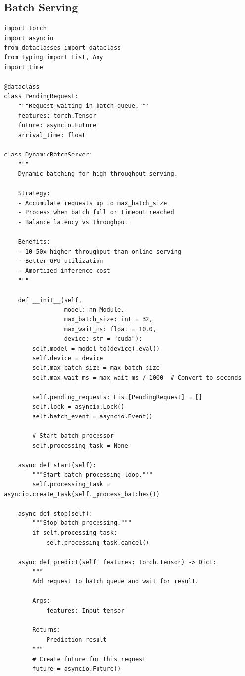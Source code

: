 \subsection{Batch Serving}

\begin{lstlisting}[style=python, caption=Dynamic batch serving for throughput optimization]
import torch
import asyncio
from dataclasses import dataclass
from typing import List, Any
import time

@dataclass
class PendingRequest:
    """Request waiting in batch queue."""
    features: torch.Tensor
    future: asyncio.Future
    arrival_time: float

class DynamicBatchServer:
    """
    Dynamic batching for high-throughput serving.

    Strategy:
    - Accumulate requests up to max_batch_size
    - Process when batch full or timeout reached
    - Balance latency vs throughput

    Benefits:
    - 10-50x higher throughput than online serving
    - Better GPU utilization
    - Amortized inference cost
    """

    def __init__(self,
                 model: nn.Module,
                 max_batch_size: int = 32,
                 max_wait_ms: float = 10.0,
                 device: str = "cuda"):
        self.model = model.to(device).eval()
        self.device = device
        self.max_batch_size = max_batch_size
        self.max_wait_ms = max_wait_ms / 1000  # Convert to seconds

        self.pending_requests: List[PendingRequest] = []
        self.lock = asyncio.Lock()
        self.batch_event = asyncio.Event()

        # Start batch processor
        self.processing_task = None

    async def start(self):
        """Start batch processing loop."""
        self.processing_task = asyncio.create_task(self._process_batches())

    async def stop(self):
        """Stop batch processing."""
        if self.processing_task:
            self.processing_task.cancel()

    async def predict(self, features: torch.Tensor) -> Dict:
        """
        Add request to batch queue and wait for result.

        Args:
            features: Input tensor

        Returns:
            Prediction result
        """
        # Create future for this request
        future = asyncio.Future()


\end{lstlisting}
